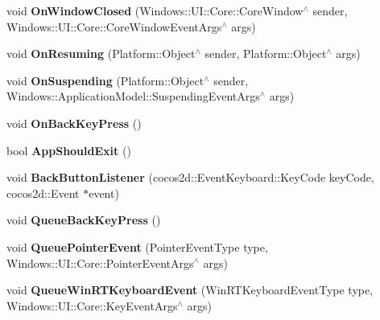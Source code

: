 \begin{DoxyCompactItemize}
\item 
\mbox{\label{classGLViewImpl_ad2fdc05008c8444b659af2e68ad49c53}} 
void {\bfseries On\+Window\+Closed} (Windows\+::\+U\+I\+::\+Core\+::\+Core\+Window$^\wedge$ sender, Windows\+::\+U\+I\+::\+Core\+::\+Core\+Window\+Event\+Args$^\wedge$ args)
\item 
\mbox{\label{classGLViewImpl_ac4207625df6e2cd5de0d2fdedaedaf85}} 
void {\bfseries On\+Resuming} (Platform\+::\+Object$^\wedge$ sender, Platform\+::\+Object$^\wedge$ args)
\item 
\mbox{\label{classGLViewImpl_ad6084014943ae4358f2be23b647a102c}} 
void {\bfseries On\+Suspending} (Platform\+::\+Object$^\wedge$ sender, Windows\+::\+Application\+Model\+::\+Suspending\+Event\+Args$^\wedge$ args)
\item 
\mbox{\label{classGLViewImpl_adeb1b307fddf705b9b4f7a1cd64011e6}} 
void {\bfseries On\+Back\+Key\+Press} ()
\item 
\mbox{\label{classGLViewImpl_a4831ae9cdaf968d7ba725335238e563a}} 
bool {\bfseries App\+Should\+Exit} ()
\item 
\mbox{\label{classGLViewImpl_a3b6ec22e322caa12bbbcd73dabc5fd5b}} 
void {\bfseries Back\+Button\+Listener} (cocos2d\+::\+Event\+Keyboard\+::\+Key\+Code key\+Code, cocos2d\+::\+Event $\ast$event)
\item 
\mbox{\label{classGLViewImpl_aeb2f8bb2a92daa0d08a0c8acc69895f3}} 
void {\bfseries Queue\+Back\+Key\+Press} ()
\item 
\mbox{\label{classGLViewImpl_ac0fd50e4189ad85b977ab129c6a7041a}} 
void {\bfseries Queue\+Pointer\+Event} (Pointer\+Event\+Type type, Windows\+::\+U\+I\+::\+Core\+::\+Pointer\+Event\+Args$^\wedge$ args)
\item 
\mbox{\label{classGLViewImpl_a96472fe10e5727580b91ac3d3511ca44}} 
void {\bfseries Queue\+Win\+R\+T\+Keyboard\+Event} (Win\+R\+T\+Keyboard\+Event\+Type type, Windows\+::\+U\+I\+::\+Core\+::\+Key\+Event\+Args$^\wedge$ args)
\item 

\end{DoxyCompactItemize}
